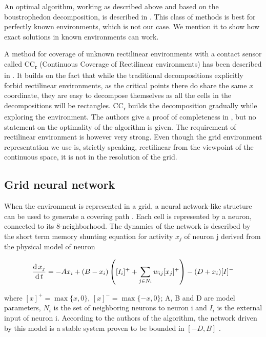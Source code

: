 \documentclass[buriama8_dp.tex]{subfiles}
\begin{document}
An optimal algorithm, working as described above and based on the boustrophedon decomposition, is described in \cite{optimalcoverage}. This class of methods is best for perfectly known environments, which is not our case. We mention it to show how exact solutions in known environments can work.

\def\CCr{CC\textsubscript{r} }
A method for coverage of unknown rectilinear environments with a contact sensor called \CCr  (Continuous Coverage of Rectilinear environments) has been described in \cite{ccrpaper}. It builds on the fact that while the traditional decompositions explicitly forbid rectilinear environments, as the critical points there do share the same \(x\) coordinate, they are easy to decompose themselves as all the cells in the decompositions will be rectangles. \CCr builds the decomposition gradually while exploring the environment. The authors give a proof of completeness in \cite{ccrpaper}, but no statement on the optimality of the algorithm is given. The requirement of rectilinear environment is however very strong. Even though the grid environment representation we use is, strictly speaking, rectilinear from the viewpoint of the continuous space, it is not in the resolution of the grid.


\subsection{Grid neural network}
\label{subsec:nncpp}
When the environment is represented in a grid, a neural network-like structure can be used to generate a covering path \cite{neural}. Each cell is represented by a neuron, connected to its 8-neighborhood. The dynamics of the network is described by the short term memory shunting equation for activity \(x_j\) of neuron \m j derived from the physical model of neuron \cite[sec.~III]{neural}
 
\begin{equation}
  \frac{\textrm{d}\, x_j}{\textrm{d}\, t} = -Ax_i + (B-x_i) \left( [I_i]^+ + \sum_{j \in N_i} w_{ij}[x_j]^+ \right) - (D+x_i)[I]^-
\label{eqn:shunting}
\end{equation}

\noindent where \([x]^+=\max\{x,0\}\), \([x]^-=\max\{-x,0\}\); \m A, \m B and \m D are model parameters, \(N_i\) is the set of neighboring neurons to neuron \m i and \(I_i\) is the external input of neuron \m i. According to the authors of the algorithm, the network driven by this model is a stable system proven to be bounded in \([-D,B]\) \cite{grossbergmodel}.
\end{document}
